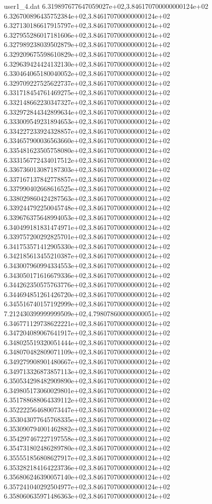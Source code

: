 \begin{filecontents}{user1_4.dat}
6.319897677647059027e+02,3.846170700000000124e+02
6.326700896435752384e+02,3.846170700000000124e+02
6.327130186617915797e+02,3.846170700000000124e+02
6.327955286017181606e+02,3.846170700000000124e+02
6.327989238039502879e+02,3.846170700000000124e+02
6.329209675598610829e+02,3.846170700000000124e+02
6.329639424424132130e+02,3.846170700000000124e+02
6.330464065180040052e+02,3.846170700000000124e+02
6.329709227525622737e+02,3.846170700000000124e+02
6.331718454761469275e+02,3.846170700000000124e+02
6.332148662230347327e+02,3.846170700000000124e+02
6.332972844342899634e+02,3.846170700000000124e+02
6.333009549231894653e+02,3.846170700000000124e+02
6.334227233924328857e+02,3.846170700000000124e+02
6.334657900036563660e+02,3.846170700000000124e+02
6.335481623505758080e+02,3.846170700000000124e+02
6.333156772434017512e+02,3.846170700000000124e+02
6.336736013087187303e+02,3.846170700000000124e+02
6.337167137842778857e+02,3.846170700000000124e+02
6.337990402668616525e+02,3.846170700000000124e+02
6.338029860424287563e+02,3.846170700000000124e+02
6.339244792250045748e+02,3.846170700000000124e+02
6.339676375648994053e+02,3.846170700000000124e+02
6.340499181831474971e+02,3.846170700000000124e+02
6.339757200292825701e+02,3.846170700000000124e+02
6.341753571412905330e+02,3.846170700000000124e+02
6.342185613455210387e+02,3.846170700000000124e+02
6.343007960994334553e+02,3.846170700000000124e+02
6.343050171616679336e+02,3.846170700000000124e+02
6.344262350575763776e+02,3.846170700000000124e+02
6.344694851261426720e+02,3.846170700000000124e+02
6.345516740157192999e+02,3.846170700000000124e+02
7.212430399999999509e+02,4.798078600000000051e+02
6.346771129738622221e+02,3.846170700000000124e+02
6.347204089067641917e+02,3.846170700000000124e+02
6.348025519320051444e+02,3.846170700000000124e+02
6.348070482809071109e+02,3.846170700000000124e+02
6.349279908901480667e+02,3.846170700000000124e+02
6.349713326873857113e+02,3.846170700000000124e+02
6.350534298482909890e+02,3.846170700000000124e+02
6.349805173060029801e+02,3.846170700000000124e+02
6.351788688064339112e+02,3.846170700000000124e+02
6.352222564680073447e+02,3.846170700000000124e+02
6.353043077645768335e+02,3.846170700000000124e+02
6.353090794001462882e+02,3.846170700000000124e+02
6.354297467227197558e+02,3.846170700000000124e+02
6.354731802486289780e+02,3.846170700000000124e+02
6.355551856808627917e+02,3.846170700000000124e+02
6.353282184164223736e+02,3.846170700000000124e+02
6.356806246390057140e+02,3.846170700000000124e+02
6.357241040292504977e+02,3.846170700000000124e+02
6.358060635971486363e+02,3.846170700000000124e+02

\end{filecontents}
